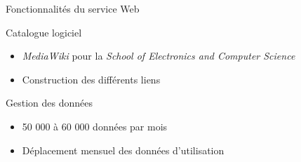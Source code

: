\begin{frame}{Fonctionnalit\'es du service Web}
	\begin{block}{Catalogue logiciel}
		\begin{itemize}
			\item \textit{MediaWiki} pour la \textit{School of Electronics and Computer Science}
			\item Construction des diff\'erents liens
			
		\end{itemize}

	\end{block}
	
	\begin{block}{Gestion des donn\'ees}
		\begin{itemize}
			\item 50 000 \`a 60 000 donn\'ees par mois
			\item D\'eplacement mensuel des donn\'ees d'utilisation
			
		\end{itemize}

	\end{block}

\end{frame}


